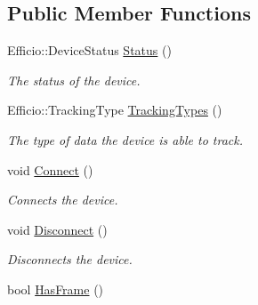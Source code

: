 \subsection*{Public Member Functions}
\begin{DoxyCompactItemize}
\item 
Efficio\+::\+Device\+Status \hyperlink{class_efficio_1_1_g_p_s_device_adc2edac03253a6d7f468135eba8ae221}{Status} ()\hypertarget{class_efficio_1_1_g_p_s_device_adc2edac03253a6d7f468135eba8ae221}{}\label{class_efficio_1_1_g_p_s_device_adc2edac03253a6d7f468135eba8ae221}

\begin{DoxyCompactList}\small\item\em The status of the device. \end{DoxyCompactList}\item 
Efficio\+::\+Tracking\+Type \hyperlink{class_efficio_1_1_g_p_s_device_a7361d892d2dea59295cd0bf1e860b855}{Tracking\+Types} ()\hypertarget{class_efficio_1_1_g_p_s_device_a7361d892d2dea59295cd0bf1e860b855}{}\label{class_efficio_1_1_g_p_s_device_a7361d892d2dea59295cd0bf1e860b855}

\begin{DoxyCompactList}\small\item\em The type of data the device is able to track. \end{DoxyCompactList}\item 
void \hyperlink{class_efficio_1_1_g_p_s_device_ad7c96eced420d549b8768f1c731f6f61}{Connect} ()\hypertarget{class_efficio_1_1_g_p_s_device_ad7c96eced420d549b8768f1c731f6f61}{}\label{class_efficio_1_1_g_p_s_device_ad7c96eced420d549b8768f1c731f6f61}

\begin{DoxyCompactList}\small\item\em Connects the device. \end{DoxyCompactList}\item 
void \hyperlink{class_efficio_1_1_g_p_s_device_ac1c3ce6d9c81a9a222c98f707c878ef1}{Disconnect} ()\hypertarget{class_efficio_1_1_g_p_s_device_ac1c3ce6d9c81a9a222c98f707c878ef1}{}\label{class_efficio_1_1_g_p_s_device_ac1c3ce6d9c81a9a222c98f707c878ef1}

\begin{DoxyCompactList}\small\item\em Disconnects the device. \end{DoxyCompactList}\item 
bool \hyperlink{class_efficio_1_1_g_p_s_device_a2cb723e98c0bd45d53cf368c3ab86943}{Has\+Frame} ()\hypertarget{class_efficio_1_1_g_p_s_device_a2cb723e98c0bd45d53cf368c3ab86943}{}\label{class_efficio_1_1_g_p_s_device_a2cb723e98c0bd45d53cf368c3ab86943}


\end{DoxyCompactItemize}
